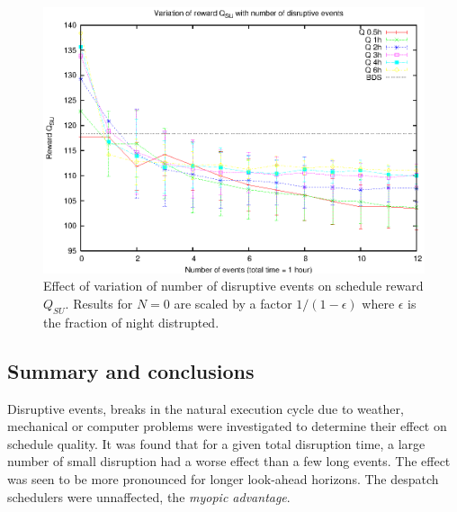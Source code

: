 \begin{figure}[h]
\begin{center}
 \includegraphics[scale=1.0, angle=0]{figures/disruption.eps}
 \caption[Effect of variation of number of disruptive events $N$ on total schedule reward $Q_{SU}$.] 
   {Effect of variation of number of disruptive events on schedule reward $Q_{SU}$. Results for $N = 0$ are scaled by a factor $1/(1-\epsilon)$ where $\epsilon$ is the fraction of night distrupted.}
\label{fig:disrupt}
\end{center}
\end{figure}

\subsection{Summary and conclusions}
Disruptive events, breaks in the natural execution cycle due to weather, mechanical or computer problems were investigated to determine their effect on schedule quality. It was found that for a given total disruption time, a large number of small disruption had a worse effect than a few long events. The effect was seen to be more pronounced for longer look-ahead horizons. The despatch schedulers were unnaffected, the \emph{myopic advantage}.
